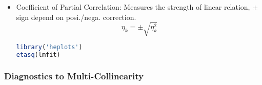 \begin{itemize}[topsep=2pt,itemsep=2pt]
    \item Coefficient of Partial Correlation: Measures the strength of linear relation, $ \pm $ sign depend on posi./nega. correction.
    \begin{equation}
        \eta_k=\pm \sqrt{\eta^2_k} 
    \end{equation}
    
    
\begin{rcode}
\begin{lstlisting}[language=R]
library('heplots')
etasq(lmfit)
\end{lstlisting}

\end{rcode}

\end{itemize}











\subsubsection{Diagnostics to Multi-Collinearity}
    
